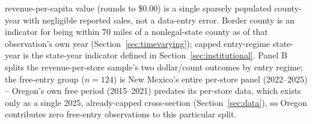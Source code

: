 \begin{table}[htbp]
\begin{minipage}{0.95\textwidth}
revenue-per-capita value (rounds to \$0.00) is a single sparsely populated county-year with negligible
reported sales, not a data-entry error. Border county is an indicator for being within 70 miles of a
nonlegal-state county as of that observation's own year (Section~\ref{sec:timevarying}); capped entry-regime
state-year is the state-year indicator defined in Section~\ref{sec:institutional}. Panel B splits the
revenue-per-store sample's two dollar/count outcomes by entry regime; the free-entry group ($n=124$) is New
Mexico's entire per-store panel (2022--2025) -- Oregon's own free period (2015--2021) predates its per-store
data, which exists only as a single 2025, already-capped cross-section (Section~\ref{sec:data}), so Oregon
contributes zero free-entry observations to this particular split.
\end{minipage}
\end{table}
